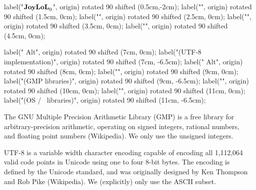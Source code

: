 label("$\bold{JoyLoL}_0$", origin) rotated 90 shifted (0.5cm,-2cm);
label("", origin) rotated 90 shifted (1.5cm, 0cm);
label("", origin) rotated 90 shifted (2.5cm, 0cm);
label("", origin) rotated 90 shifted (3.5cm, 0cm);
label("", origin) rotated 90 shifted (4.5cm, 0cm);

label(" Alt", origin) rotated 90 shifted (7cm, 0cm);
label("(UTF-8 implementation)", origin) rotated 90 shifted (7cm, -6.5cm);
label(" Alt", origin) rotated 90 shifted (8cm, 0cm);
label("", origin) rotated 90 shifted (9cm, 0cm);
label("(GMP libraries)", origin) rotated 90 shifted (9cm, -6.5cm);
label("", origin) rotated 90 shifted (10cm, 0cm);
label("", origin) rotated 90 shifted (11cm, 0cm);
label("(OS / \LuaTeX\ libraries)", origin) rotated 90 shifted (11cm, -6.5cm);
\stopMPcode\egroup

The GNU Multiple Precision Arithmetic Library (GMP) is a free library for 
arbitrary-precision arithmetic, operating on signed integers, rational 
numbers, and floating point numbers (Wikipedia). We only use the unsigned 
integers. 

UTF-8 is a variable width character encoding capable of encoding all 
1,112,064 valid code points in Unicode using one to four 8-bit bytes. The 
encoding is defined by the Unicode standard, and was originally designed 
by Ken Thompson and Rob Pike (Wikipedia). We (explicitly) only use the 
ASCII subset. 

